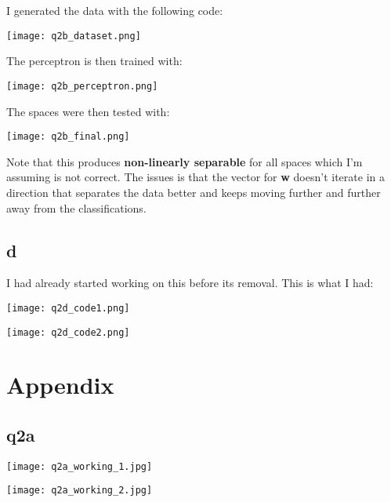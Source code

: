 \documentclass{article}
\begin{document}
I generated the data with the following code:

\texttt{[image: q2b\_dataset.png]}

The perceptron is then trained with:

\texttt{[image: q2b\_perceptron.png]}

The spaces were then tested with:

\texttt{[image: q2b\_final.png]}

Note that this produces \textbf{non-linearly separable} for all spaces which I'm assuming is not correct.
The issues is that the vector for \textbf{w} doesn't iterate in a direction that separates the data 
better and keeps moving further and further away from the classifications.

\subsection*{d}

I had already started working on this before its removal. This is what I had:

\texttt{[image: q2d\_code1.png]}

\texttt{[image: q2d\_code2.png]}

\newpage
\section*{Appendix}

\subsection{q2a}
\label{working:2a}
\texttt{[image: q2a\_working\_1.jpg]}

\newpage
\texttt{[image: q2a\_working\_2.jpg]}
\end{document}
